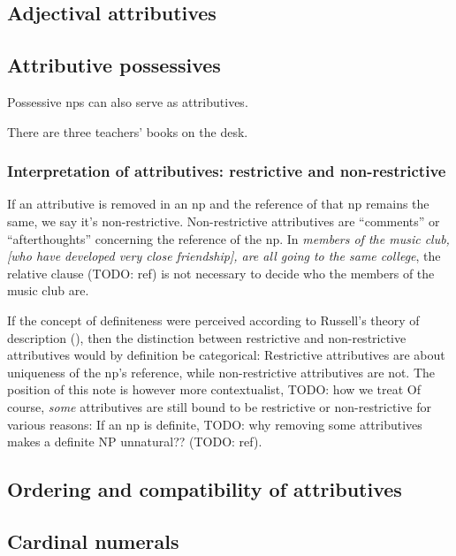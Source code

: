 \documentclass[UTF8, a4paper, oneside, scheme=plain, 12pt]{ctexbook}
\newcommand{\form}[1]{\emph{#1}}
\begin{document}
\subsection{Adjectival attributives}

\subsection{Attributive possessives}

Possessive \acs{np}s can also serve as attributives. 

\begin{exe}
    \ex There are three teachers' books on the desk.
\end{exe}

\subsubsection{Interpretation of attributives: restrictive and non-restrictive}

If an attributive is removed in an \acs{np} 
and the reference of that \acs{np} remains the same,
we say it's non-restrictive.
Non-restrictive attributives are ``comments'' or ``afterthoughts'' concerning the reference of the \acs{np}.
In \form{members of the music club, 
[who have developed very close friendship], 
are all going to the same college},
the relative clause (TODO: ref) is not necessary to decide who the members of the music club are.

If the concept of definiteness were perceived according to Russell's theory of description 
(),
then the distinction between restrictive and non-restrictive attributives 
would by definition be categorical:
Restrictive attributives are about uniqueness of the \acs{np}'s reference,
while non-restrictive attributives are not.
The position of this note is however more contextualist,
TODO: how we treat 
Of course, \emph{some} attributives are still bound to be restrictive 
or non-restrictive for various reasons:
If an \acs{np} is definite, 
TODO: why removing some attributives makes a definite NP unnatural??
(TODO: ref).

\subsection{Ordering and compatibility of attributives}

\subsection{Cardinal numerals}
\end{document}

